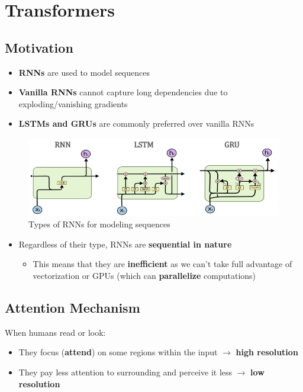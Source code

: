 \chapter{Transformers}

\section{Motivation}
\begin{itemize}
    \item \textbf{RNNs} are used to model sequences
    \item \textbf{Vanilla RNNs} cannot capture long dependencies due to exploding/vanishing gradients
    \item \textbf{LSTMs  and GRUs} are commonly preferred over vanilla RNNs
\end{itemize}

\begin{figure}[h!t]
    \centering
    \includegraphics[width=0.75\linewidth]{rnntypes.png}
    \caption{Types of RNNs for modeling sequences}
    \label{fig:enter-label}
\end{figure}
\begin{itemize}
    \item Regardless of their type, RNNs are \textbf{sequential in nature}
    \begin{itemize}
        \item This means that they are \textbf{inefficient} as we can't take full advantage of vectorization or GPUs (which can \textbf{parallelize} computations)
    \end{itemize}
\end{itemize}

\section{Attention Mechanism}

When humans read or look:
\begin{itemize}
  \item They focus (\textbf{attend}) on some regions within the input $\rightarrow$ \textbf{high resolution}
  \item They pay less attention to surrounding and perceive it less $\rightarrow$ \textbf{low resolution}
\end{itemize}

